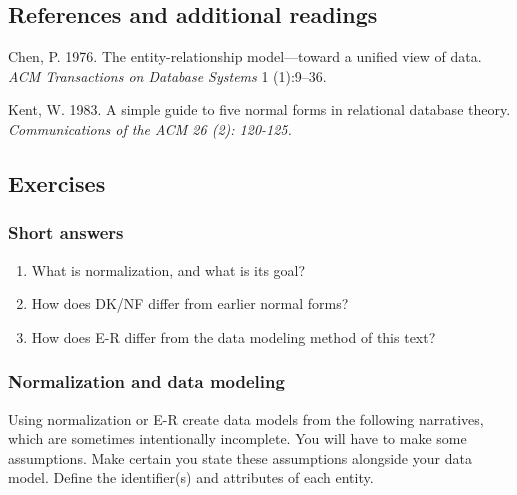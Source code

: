 \documentclass[
]{article}
\begin{document}
\hypertarget{references-and-additional-readings-3}{%
\subsection*{References and additional readings}\label{references-and-additional-readings-3}}

Chen, P. 1976. The entity-relationship model---toward a unified view of
data. \emph{ACM Transactions on Database Systems} 1 (1):9--36.

Kent, W. 1983. A simple guide to five normal forms in relational
database theory. \emph{Communications of the ACM 26 (2): 120-125.}

\hypertarget{exercises-7}{%
\subsection*{Exercises}\label{exercises-7}}

\hypertarget{short-answers-1}{%
\subsubsection*{Short answers}\label{short-answers-1}}

\begin{enumerate}
\def\labelenumi{\arabic{enumi}.}
\item
  What is normalization, and what is its goal?
\item
  How does DK/NF differ from earlier normal forms?
\item
  How does E-R differ from the data modeling method of this text?
\end{enumerate}

\hypertarget{normalization-and-data-modeling}{%
\subsubsection*{Normalization and data modeling}\label{normalization-and-data-modeling}}

Using normalization or E-R create data models from the following
narratives, which are sometimes intentionally incomplete. You will have
to make some assumptions. Make certain you state these assumptions
alongside your data model. Define the identifier(s) and attributes of
each entity.
\end{document}
